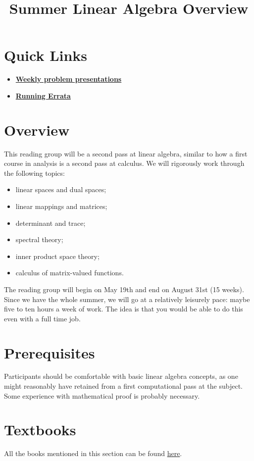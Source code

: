 \documentclass{article}
\title{Summer Linear Algebra Overview}
\begin{document}
\maketitle

\section{Quick Links}
\begin{itemize}
  \item \href{https://www.overleaf.com/project/682e5e6324c0ef2720a9e16f}{\textbf{Weekly problem presentations}}
  \item \href{https://www.overleaf.com/project/682e5fe73df63ce5ead80eea}{\textbf{Running Errata}}
\end{itemize}

\section{Overview}
This reading group will be a second pass at linear algebra, similar to how a first course in analysis is a second pass at calculus. We will rigorously work through the following topics:
\begin{itemize}
    \item linear spaces and dual spaces;
    \item linear mappings and matrices;
    \item determinant and trace;
    \item spectral theory;
    \item inner product space theory;
    \item calculus of matrix-valued functions.
\end{itemize}

The reading group will begin on May 19th and end on August 31st (15 weeks). Since we have the whole summer, we will go at a relatively leisurely pace: maybe five to ten hours a week of work. The idea is that you would be able to do this even with a full time job.

\section{Prerequisites}
Participants should be comfortable with basic linear algebra concepts, as one might reasonably have retained from a first computational pass at the subject. Some experience with mathematical proof is probably necessary.

\section{Textbooks}
All the books mentioned in this section can be found \href{https://drive.google.com/drive/folders/1chb49hv65hB8ZXcne0Ljfh3viO_SdOmW?usp=drive_link}{here}.
\end{document}
